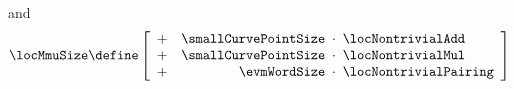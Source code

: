 \begin{description}
\begin{description}
				and
				\[
					\locMmuSize \define
					\left[ \begin{array}{crcl}
						+ & \smallCurvePointSize & \!\!\!\cdot\!\!\! & \locNontrivialAdd     \\
						+ & \smallCurvePointSize & \!\!\!\cdot\!\!\! & \locNontrivialMul     \\
						+ & \evmWordSize         & \!\!\!\cdot\!\!\! & \locNontrivialPairing \\
					\end{array} \right]
				\]

\end{description}
\end{description}
